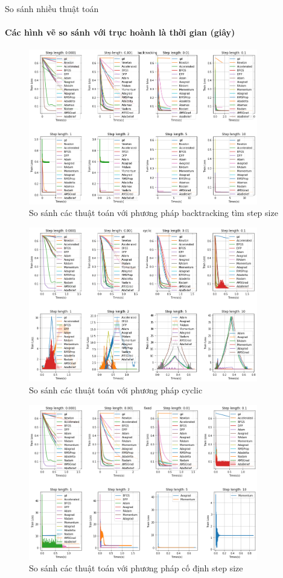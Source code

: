 \documentclass[10pt]{beamer}
\theoremstyle{remark}
\theoremstyle{definition}
\begin{document}
\begin{frame}[allowframebreaks]{So sánh nhiều thuật toán}
	\framesubtitle{Các hình vẽ so sánh với trục hoành là thời gian (giây)}
	\begin{figure}
		\centering
		\includegraphics[width=10cm]{Thanh/backtrack-lr-step-op_time.png}
		\caption{So sánh các thuật toán với phương pháp backtracking tìm step size}
	\end{figure}

	\begin{figure}
		\centering
		\includegraphics[width=10cm]{Thanh/cyclic-lr-step-op_time.png}
		\caption{So sánh các thuật toán với phương pháp cyclic}
	\end{figure}

	\begin{figure}
		\centering
		\includegraphics[width=10cm]{Thanh/fixed-lr-step-op_time.png}
		\caption{So sánh các thuật toán với phương pháp cố định step size}
	\end{figure}


\end{frame}
\end{document}
